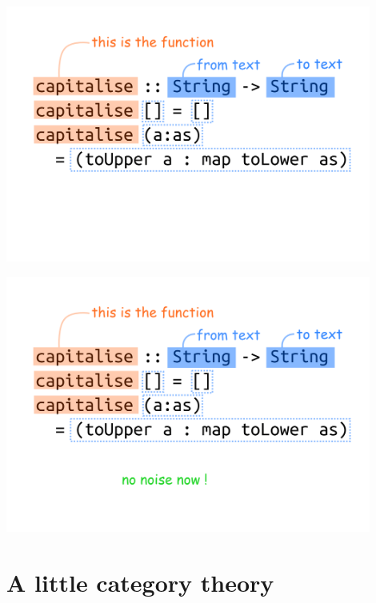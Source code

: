 \documentclass[xcolor={table}]{beamer}
\begin{document}
\begin{frame}{}{}

    \centering
    \includegraphics[width=0.9\textwidth]{images/haskell-code-04.png}

\end{frame}

\begin{frame}{}{}

    \centering
    \includegraphics[width=0.9\textwidth]{images/haskell-code-05.png}

\end{frame}


\section{A little category theory}
\end{document}

